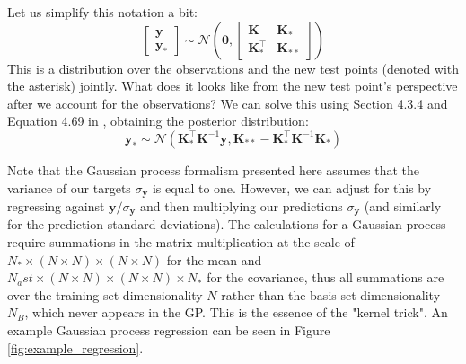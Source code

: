 \documentclass{article}
\begin{document}
Let us simplify this notation a bit:
\begin{equation}
    \begin{bmatrix}
    \mathbf{y} \\
    \mathbf{y_\ast}
    \end{bmatrix} \sim
    \mathcal{N}\left(\mathbf{0},
    \begin{bmatrix}
    \mathbf{K} & \mathbf{K}_\ast \\
    \mathbf{K}^\top_\ast & \mathbf{K}_{\ast\ast}
    \end{bmatrix}\right)
\end{equation} 
This is a distribution over the observations and the new test points (denoted with the asterisk) jointly. What does it looks like from the new test point's perspective after we account for the observations?  We can solve this using Section 4.3.4 and Equation 4.69 in \cite{murphy}, obtaining the posterior distribution:
\begin{equation}
\label{GP_posterior}
\mathbf{y}_\ast\sim\mathcal{N}\left(\mathbf{K}_\ast^\top \mathbf{K}^{-1}\mathbf{y},\mathbf{K}_{\ast\ast}-\mathbf{K}_\ast^\top \mathbf{K}^{-1}\mathbf{K}_\ast \right)
\end{equation}

Note that the Gaussian process formalism presented here assumes that the variance of our targets $\sigma_\mathbf{y}$ is equal to one. However, we can adjust for this by regressing against $\mathbf{y}/\sigma_\mathbf{y}$ and then multiplying our predictions $\sigma_\mathbf{y}$ (and similarly for the prediction standard deviations). The calculations for a Gaussian process require summations in the matrix multiplication at the scale of $N_\ast \times (N \times N) \times (N \times N)$ for the mean and $N_ast \times (N \times N) \times (N \times N) \times N_\ast$ for the covariance, thus all summations are over the training set dimensionality $N$ rather than the basis set dimensionality $N_B$, which never appears in the GP. This is the essence of the "kernel trick". An example Gaussian process regression can be seen in Figure \ref{fig:example_regression}.
\end{document}

